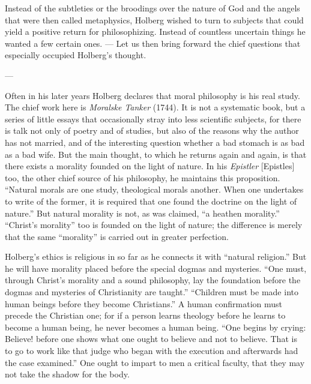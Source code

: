 \documentclass[12pt,a4paper]{book}
\newcommand{\opage}[1]{\marginnote{\footnotesize\textit{[#1]}}}
\begin{document}
Instead of the subtleties or the broodings over the nature of God and the angels
that were then called metaphysics, Holberg wished to turn to subjects that could
yield a positive return for philosophizing. Instead of countless uncertain things
he wanted a few certain ones. --- Let us then bring forward the chief questions
that especially occupied Holberg's thought.

\begin{center}---\end{center}

Often in his later years Holberg declares that moral philosophy is his real
study. The chief work here is \emph{Moralske Tanker} (1744). It is not a
systematic book, but a series of little essays that occasionally stray into less
scientific subjects, for there is talk not only of poetry and of studies, but
also of the reasons why the author has not married, and of the interesting
question whether a bad stomach is as bad as a bad wife. But the main thought, to
which he returns again and again, is that there exists a morality founded on the
light of nature. In his \emph{Epistler} [Epistles] too, the other chief source \opage{9}of
his philosophy, he maintains this proposition. ``Natural morals are one study,
theological morals another. When one undertakes to write of the former, it is
required that one found the doctrine on the light of nature.'' But natural
morality is not, as was claimed, ``a heathen morality.'' ``Christ's morality''
too is founded on the light of nature; the difference is merely that the same
``morality'' is carried out in greater perfection.

Holberg's ethics is religious in so far as he connects it with ``natural
religion.'' But he will have morality placed before the special dogmas and
mysteries. ``One must, through Christ's morality and a sound philosophy, lay the
foundation before the dogmas and mysteries of Christianity are taught.''
``Children must be made into human beings before they become Christians.'' A human
confirmation must precede the Christian one; for if a person learns theology
before he learns to become a human being, he never becomes a human being. ``One
begins by crying: Believe! before one shows what one ought to believe and not to
believe. That is to go to work like that judge who began with the execution and
afterwards had the case examined.'' One ought to impart to men a critical
faculty, that they may not take the shadow for the body.
\end{document}
